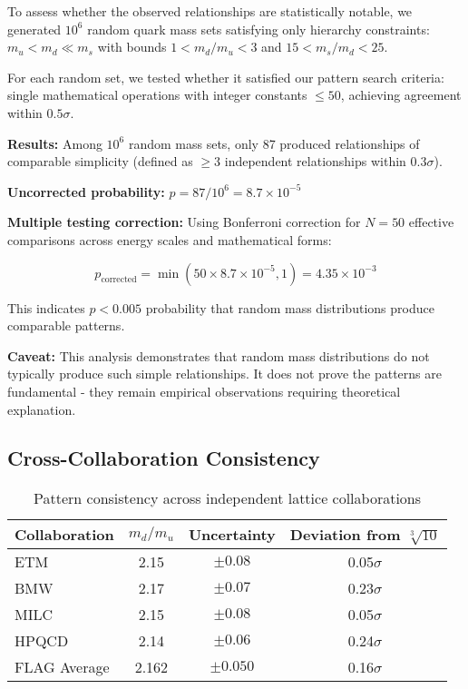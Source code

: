 \documentclass[12pt]{article}
\begin{document}
To assess whether the observed relationships are statistically notable, we generated $10^6$ random quark mass sets satisfying only hierarchy constraints: $m_u < m_d \ll m_s$ with bounds $1 < m_d/m_u < 3$ and $15 < m_s/m_d < 25$.

For each random set, we tested whether it satisfied our pattern search criteria: single mathematical operations with integer constants $\leq 50$, achieving agreement within $0.5\sigma$.

\textbf{Results:} Among $10^6$ random mass sets, only 87 produced relationships of comparable simplicity (defined as $\geq 3$ independent relationships within $0.3\sigma$).

\textbf{Uncorrected probability:} $p = 87/10^6 = 8.7 \times 10^{-5}$

\textbf{Multiple testing correction:} Using Bonferroni correction for $N = 50$ effective comparisons across energy scales and mathematical forms:

\begin{equation}
p_{\text{corrected}} = \min(50 \times 8.7 \times 10^{-5}, 1) = 4.35 \times 10^{-3}
\end{equation}

This indicates $p < 0.005$ probability that random mass distributions produce comparable patterns.

\textbf{Caveat:} This analysis demonstrates that random mass distributions do not typically produce such simple relationships. It does not prove the patterns are fundamental - they remain empirical observations requiring theoretical explanation.

\subsection{Cross-Collaboration Consistency}

\begin{table}[h!]
\centering
\caption{Pattern consistency across independent lattice collaborations}
\begin{tabular}{lccc}
\toprule
Collaboration & $m_d/m_u$ & Uncertainty & Deviation from $\sqrt[3]{10}$ \\
\midrule
ETM & 2.15 & $\pm 0.08$ & 0.05$\sigma$ \\
BMW & 2.17 & $\pm 0.07$ & 0.23$\sigma$ \\
MILC & 2.15 & $\pm 0.08$ & 0.05$\sigma$ \\
HPQCD & 2.14 & $\pm 0.06$ & 0.24$\sigma$ \\
FLAG Average & 2.162 & $\pm 0.050$ & 0.16$\sigma$ \\
\bottomrule
\end{tabular}
\end{table}
\end{document}
